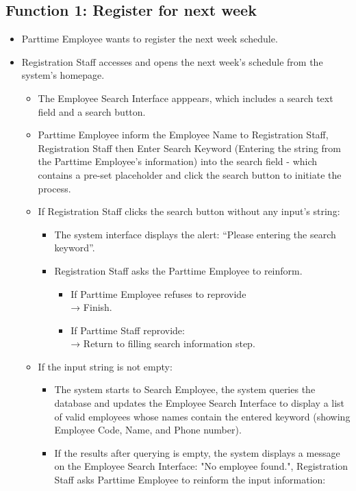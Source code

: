 \subsection{Function 1: Register for next week}
\begin{itemize}
    \item Parttime Employee wants to register the next week schedule.
    \item Registration Staff accesses and opens the next week’s schedule from the system’s homepage.
    \begin{itemize}
        \item   The Employee Search Interface apppears, which includes a search text field and a search button.
        \item	Parttime Employee inform the Employee Name to Registration Staff, Registration Staff then Enter Search Keyword (Entering the string from the Parttime Employee’s information) into the search field - which contains a pre-set placeholder and click the search button to initiate the process.
        \item If Registration Staff clicks the search button without any input’s string:
        \begin{itemize}
            \item The system interface displays the alert: “Please entering the search keyword”.
            \item Registration Staff asks the Parttime Employee to reinform.
            \begin{itemize}
                \item If Parttime Employee refuses to reprovide\\
                → Finish.
                \item If Parttime Staff reprovide:\\
                → Return to filling search information step.
            \end{itemize}
        \end{itemize}
        \item If the input string is not empty:
        \begin{itemize}
            \item The system starts to Search Employee, the system queries the database and updates the Employee Search Interface to display a list of valid employees whose names contain the entered keyword (showing Employee Code, Name, and Phone number).
            \item If the results after querying is empty, the system displays a message on the Employee Search Interface: "No employee found.", Registration Staff asks Parttime Employee to reinform the input information:

\end{itemize}
\end{itemize}
\end{itemize}
